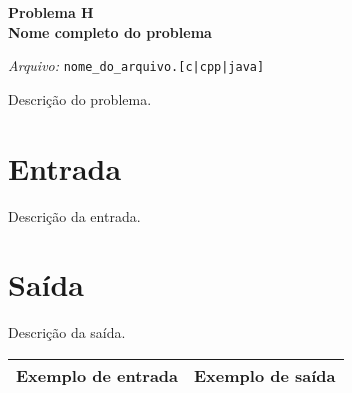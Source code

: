 \newpage

\begin{center}
\LARGE{\textbf{Problema H} \\ \textbf{Nome completo do problema}} 

\vspace{0.5em}
\normalsize

\textit{Arquivo:}
\verb+nome_do_arquivo.[c|cpp|java]+  

\end{center}

Descrição do problema. \\

\section*{Entrada}

Descrição da entrada. \\

\section*{Saída}

Descrição da saída. \\

\begin{center}
  \begin{tabular}{ | l | l | }
    \hline
    \textbf{Exemplo de entrada} & \textbf{Exemplo de saída} \\ 
    \hline
	
	\hline
  \end{tabular}
\end{center}